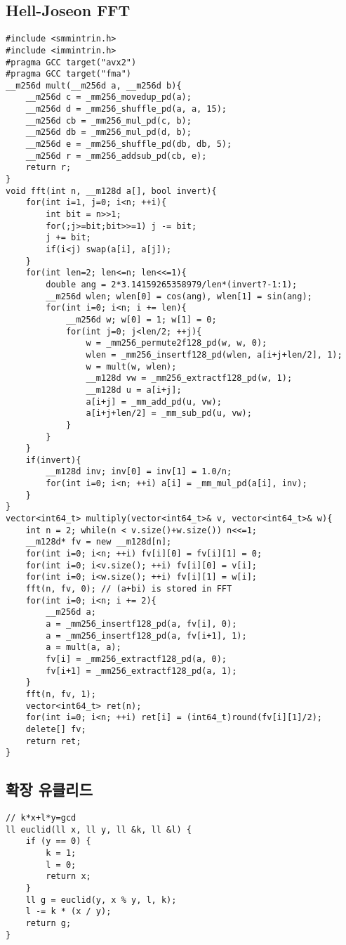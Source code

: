 \documentclass[landscape, 8pt, a4paper, oneside, twocolumn]{extarticle}
\begin{document}
\subsection{Hell-Joseon FFT}
\begin{verbatim}
#include <smmintrin.h>
#include <immintrin.h>
#pragma GCC target("avx2")
#pragma GCC target("fma")
__m256d mult(__m256d a, __m256d b){
	__m256d c = _mm256_movedup_pd(a);
	__m256d d = _mm256_shuffle_pd(a, a, 15);
	__m256d cb = _mm256_mul_pd(c, b);
	__m256d db = _mm256_mul_pd(d, b);
	__m256d e = _mm256_shuffle_pd(db, db, 5);
	__m256d r = _mm256_addsub_pd(cb, e);
	return r;
}
void fft(int n, __m128d a[], bool invert){
	for(int i=1, j=0; i<n; ++i){
		int bit = n>>1;
		for(;j>=bit;bit>>=1) j -= bit;
		j += bit;
		if(i<j) swap(a[i], a[j]);
	}
	for(int len=2; len<=n; len<<=1){
		double ang = 2*3.14159265358979/len*(invert?-1:1);
		__m256d wlen; wlen[0] = cos(ang), wlen[1] = sin(ang);
		for(int i=0; i<n; i += len){
			__m256d w; w[0] = 1; w[1] = 0;
			for(int j=0; j<len/2; ++j){
				w = _mm256_permute2f128_pd(w, w, 0);
				wlen = _mm256_insertf128_pd(wlen, a[i+j+len/2], 1);
				w = mult(w, wlen);
				__m128d vw = _mm256_extractf128_pd(w, 1);
				__m128d u = a[i+j];
				a[i+j] = _mm_add_pd(u, vw);
				a[i+j+len/2] = _mm_sub_pd(u, vw);
			}
		}
	}
	if(invert){
		__m128d inv; inv[0] = inv[1] = 1.0/n;
		for(int i=0; i<n; ++i) a[i] = _mm_mul_pd(a[i], inv);
	}
}
vector<int64_t> multiply(vector<int64_t>& v, vector<int64_t>& w){
	int n = 2; while(n < v.size()+w.size()) n<<=1;
	__m128d* fv = new __m128d[n];
	for(int i=0; i<n; ++i) fv[i][0] = fv[i][1] = 0;
	for(int i=0; i<v.size(); ++i) fv[i][0] = v[i];
	for(int i=0; i<w.size(); ++i) fv[i][1] = w[i];
	fft(n, fv, 0); // (a+bi) is stored in FFT
	for(int i=0; i<n; i += 2){
		__m256d a;
		a = _mm256_insertf128_pd(a, fv[i], 0);
		a = _mm256_insertf128_pd(a, fv[i+1], 1);
		a = mult(a, a);
		fv[i] = _mm256_extractf128_pd(a, 0);
		fv[i+1] = _mm256_extractf128_pd(a, 1);
	}
	fft(n, fv, 1);
	vector<int64_t> ret(n);
	for(int i=0; i<n; ++i) ret[i] = (int64_t)round(fv[i][1]/2);
	delete[] fv;
	return ret;
}
\end{verbatim}
\subsection{확장 유클리드}
\begin{verbatim}
// k*x+l*y=gcd
ll euclid(ll x, ll y, ll &k, ll &l) {
	if (y == 0) {
		k = 1;
		l = 0;
		return x;
	}
	ll g = euclid(y, x % y, l, k);
	l -= k * (x / y);
	return g;
}
\end{verbatim}
\end{document}
